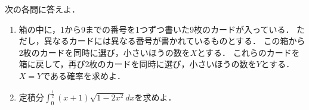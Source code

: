 \documentclass[../../main.tex]{subfiles}
\begin{document}
次の各問に答えよ．
\begin{enumerate}
  \item 箱の中に，1から9までの番号を1つずつ書いた9枚のカードが入っている．
    ただし，異なるカードには異なる番号が書かれているものとする．
    この箱から2枚のカードを同時に選び，小さいほうの数を$X$とする．
    これらのカードを箱に戻して，再び2枚のカードを同時に選び，小さいほうの数を$Y$とする．
    $X=Y$である確率を求めよ．
  \item 定積分$\displaystyle\int_0^{\frac{1}{2}}(x+1)\sqrt{1-2x^2}dx$を求めよ．
\end{enumerate}
\end{document}
